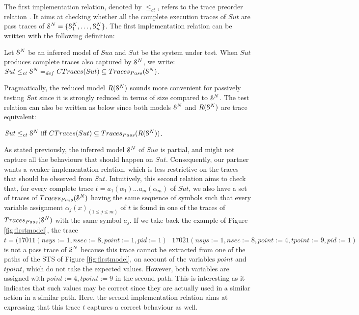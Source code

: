 The first implementation relation, denoted by $\leq_{ct}$,
refers to the trace preorder relation \cite{DNH84}. It aims at
checking whether all the complete execution traces of
$\mathit{Sut}$ are pass traces of
$\EuScript{S}^{N}=\{\EuScript{S}_1^{N},\dots,\EuScript{S}_n^{N}\}$.
The first implementation relation can be written with the
following definition:

\begin{definition}
\label{rel:impl1}

Let $\EuScript{S}^{N}$ be an inferred model of $\mathit{Sua}$ and
$\mathit{Sut}$ be the system under test. When $\mathit{Sut}$
produces complete traces also captured by $\EuScript{S}^{N}$, we
write: ${Sut} \leq_{ct} \EuScript{S}^{N} =_{def} CTraces({Sut})
\subseteq  Traces_{Pass}(\EuScript{S}^{N})$.
\end{definition}

Pragmatically, the reduced model $R(\EuScript{S}^{N})$ sounds
more convenient for passively testing $\mathit{Sut}$ since it is
strongly reduced in terms of size compared to $\EuScript{S}^{N}$.
The test relation can also be written as below since both models
$\EuScript{S}^{N}$ and $R(\EuScript{S}^{N})$ are trace equivalent:

\begin{proposition}
\label{rel:impl12}
${Sut} \leq_{ct} \EuScript{S}^{N} \text{ iff } CTraces({Sut})
\subseteq  Traces_{Pass}(R(\EuScript{S}^{N}))$.
\end{proposition}

As stated previously, the inferred model $\EuScript{S}^{N}$ of
$\mathit{Sua}$ is partial, and might not capture all the
behaviours that should happen on $\mathit{Sut}$. Consequently,
our partner wants a weaker implementation relation, which is less
restrictive on the traces that should be observed from
$\mathit{Sut}$.  Intuitively, this second relation aims to check
that, for every complete trace $t=a_1(\alpha_1)...a_m(\alpha_m)$
of $\mathit{Sut}$, we also have a set of traces of
$Traces_{Pass}(\EuScript{S}^{N})$ having the same sequence of
symbols such that every variable assignment $\alpha_j(x)_{(1 \leq
j \leq m)}$ of $t$ is found in one of the traces of
$Traces_{Pass}(\EuScript{S}^{N})$ with the same symbol $a_j$.
If we take back the example of Figure \ref{fig:firstmodel}, the
trace $t=(17011(nsys:=1,nsec:=8,point:=1,pid:=1)\text{ }
17021(nsys:=1,nsec:=8,point:=4,tpoint:=9,pid:=1)$ is not a pass trace
of $\EuScript{S}^{N}$ because this trace cannot be extracted from
one of the paths of the STS of Figure \ref{fig:firstmodel}, on
account of the variables $point$ and $tpoint$, which do not take
the expected values. However, both variables are assigned with
$point:=4,tpoint:=9$ in the second path. This is interesting as it
indicates that such values may be correct since they are actually
used in a similar action in a similar path. Here, the second
implementation relation aims at expressing that this trace $t$
captures a correct behaviour as well.

